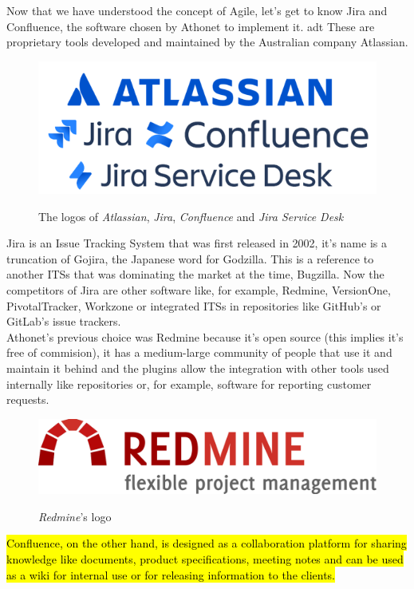 	Now that we have understood the concept of Agile, let's get to know Jira and Confluence, the software chosen by Athonet to implement it. \gls{adt}
	These are proprietary tools developed and maintained by the Australian company Atlassian.
	\begin{figure}[H]
		\centering
		\includegraphics[width=.7\textwidth]{resources/atlassian_logo}\\
		\caption{The logos of \textit{Atlassian}, \textit{Jira}, \textit{Confluence} and \textit{Jira Service Desk}}
	\end{figure}
	Jira is an Issue Tracking System that was first released in 2002, it's name is a truncation of Gojira, the Japanese word for Godzilla.
	This is a reference to another ITSs that was dominating the market at the time, Bugzilla.
	Now the competitors of Jira are other software like, for example, Redmine, VersionOne, PivotalTracker, Workzone or integrated ITSs in repositories like GitHub's or GitLab's issue trackers.\\
	Athonet's previous choice was Redmine because it's open source (this implies it's free of commision), it has a medium-large community of people that use it and maintain it behind and the plugins allow the integration with other tools used internally like repositories or, for example, software for reporting customer requests.
	\begin{figure}[H]
		\centering
		\includegraphics[width=.6\textwidth]{resources/redmine_logo}\\
		\caption{\textit{Redmine}'s logo}
	\end{figure}
	\hl{Confluence, on the other hand, is designed as a collaboration platform for sharing knowledge like documents, product specifications, meeting notes and can be used as a wiki for internal use or for releasing information to the clients.}	
